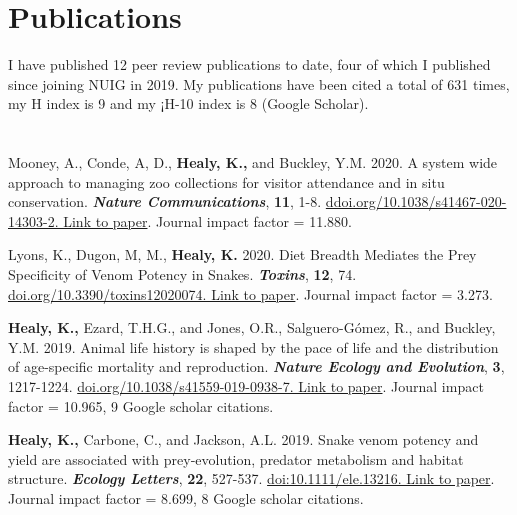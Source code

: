 \documentclass[10pt,a4paper]{article}
\begin{document}
\section{\textbf{Publications}}
\begin{flushleft}

\smallskip

I have published 12 peer review publications to date, four of which I published since joining NUIG in 2019. My publications have been cited a total of 631 times, my H index is 9 and my ¡H-10 index is 8 (Google Scholar). 

\section{\textbf{}}

\setlength{\parindent}{0mm}  Mooney, A., Conde, A, D., \textbf{Healy, K.,} and Buckley, Y.M. 2020. A system wide approach to managing zoo collections for visitor attendance and in situ conservation. \textit{\textbf{Nature Communications}},  \textbf{11}, 1-8. \href{https://www.nature.com/articles/s41467-020-14303-2}{ddoi.org/10.1038/s41467-020-14303-2. Link to paper}. Journal impact factor  = 11.880.

\bigskip

\setlength{\parindent}{0mm}  Lyons, K., Dugon, M, M., \textbf{Healy, K.} 2020. Diet Breadth Mediates the Prey Specificity of Venom Potency in Snakes. \textit{\textbf{Toxins}},  \textbf{12}, 74. \href{https://www.mdpi.com/2072-6651/12/2/74}{doi.org/10.3390/toxins12020074. Link to paper}. Journal impact factor  = 3.273.

\bigskip


\setlength{\parindent}{0mm}\textbf{Healy, K.,} Ezard, T.H.G., and Jones, O.R., Salguero-G\'{o}mez, R., and Buckley, Y.M. 2019. Animal life history is shaped by the pace of life and the distribution of age-specific mortality and reproduction. \textit{\textbf{Nature Ecology and Evolution}},  \textbf{3}, 1217-1224. \href{https://www.nature.com/articles/s41559-019-0938-7}{doi.org/10.1038/s41559-019-0938-7. Link to paper}. Journal impact factor  = 10.965, 9 Google scholar citations.

\bigskip

\setlength{\parindent}{0mm}\textbf{Healy, K.,} Carbone, C., and Jackson, A.L. 2019. Snake venom potency and yield are associated with prey‐evolution, predator metabolism and habitat structure. \textit{\textbf{Ecology Letters}}, \textbf{22}, 527-537. \href{https://onlinelibrary.wiley.com/doi/abs/10.1111/ele.13216}{doi:10.1111/ele.13216. Link to paper}. Journal impact factor = 8.699, 8 Google scholar citations.


\end{flushleft}
\end{document}
